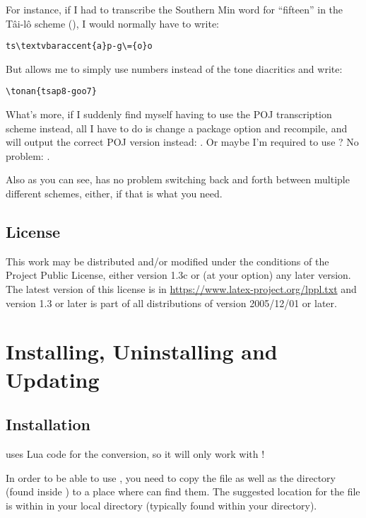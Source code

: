 \documentclass{ltxdockit}
\begin{document}
For instance, if I had to transcribe the Southern Min word for \enquote{fifteen}
in the T\^{a}i-l\^{o} scheme (), I would normally
have to write:

\begin{lstlisting}[language={[latex]tex}]
ts\textvbaraccent{a}p-g\={o}o
\end{lstlisting}

But \transconv{} allows me to simply use numbers instead of the tone
diacritics and write:

\begin{lstlisting}[language={[latex]tex}]
\tonan{tsap8-goo7}
\end{lstlisting}

What's more, if I suddenly find myself having to use the POJ transcription
scheme instead, all I have to do is change a package option and recompile, and
\transconv{} will output the correct POJ version instead: .
Or maybe I'm required to use ? No problem:
.

Also as you can see, \transconv{} has no problem switching back and forth
between multiple different schemes, either, if that is what you need.

\subsection{License}

This work may be distributed and/or modified under the conditions of the
 Project Public License, either version 1.3c or (at your option)
any later version. The latest version of this license is in
\url{https://www.latex-project.org/lppl.txt} and version 1.3 or later is part of
all distributions of  version 2005/12/01 or later.

\section{Installing, Uninstalling and Updating}

\subsection{Installation}

\transconv{} uses Lua code for the conversion, so it will only work with
!

In order to be able to use \transconv{}, you need to copy the
 file as well as the  directory (found inside
) to a place where  can find them. The
suggested location for the  file is within  in
your local  directory (typically found within your 
directory).
\end{document}
